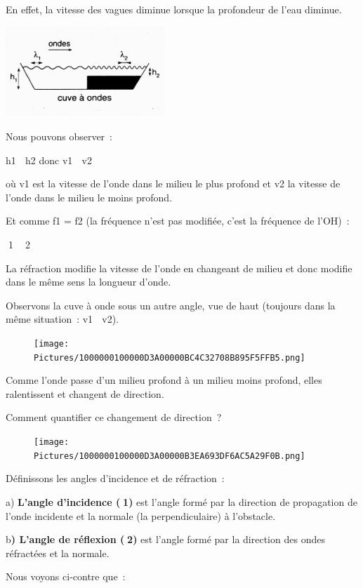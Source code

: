 En effet, la vitesse des vagues diminue lorsque la profondeur de l'eau
diminue.

\includegraphics[width=6.017cm,height=3.408cm]{Pictures/1000000100000A3C000005CCA7E68DBE45CF2A53.png}

Nous
pouvons observer~:

h1  h2 donc v1  v2

où v1 est la vitesse de l'onde dans le milieu le plus profond et v2 la
vitesse de l'onde dans le milieu le moins profond.

Et comme f1 = f2 (la fréquence n'est pas modifiée, c'est la fréquence de
l'OH)~:

1  2

La réfraction modifie la vitesse de l'onde en changeant de milieu et
donc modifie dans le même sens la longueur d'onde.

Observons la cuve à onde sous un autre angle, vue de haut (toujours dans
la même situation~: v1  v2).

\begin{figure}
\centering
\texttt{[image: Pictures/1000000100000D3A00000BC4C32708B895F5FFB5.png]}
\caption{}
\end{figure}

Comme l'onde passe d'un milieu profond à un milieu moins profond, elles
ralentissent et changent de direction.

Comment quantifier ce changement de direction~?

\begin{figure}
\centering
\texttt{[image: Pictures/1000000100000D3A00000B3EA693DF6AC5A29F0B.png]}
\caption{}
\end{figure}

Définissons les angles d'incidence et de réfraction~:

a) \textbf{L'angle d'incidence (1)} est l'angle formé par la direction
de propagation de l'onde incidente et la normale (la perpendiculaire) à
l'obstacle.

b\textbf{) L'angle de réflexion (2)} est l'angle formé par la direction
des ondes réfractées et la normale.

Nous voyons ci-contre que~:

